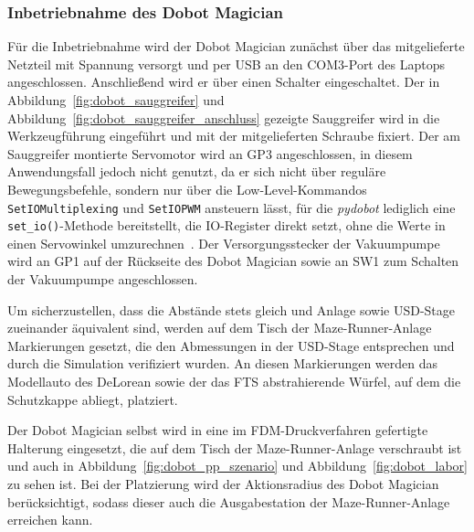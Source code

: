 \subsubsection{Inbetriebnahme des Dobot Magician}
\label{subsubsec:dobot_inbetriebnahme}

Für die Inbetriebnahme wird der Dobot Magician zunächst über das mitgelieferte Netzteil mit Spannung versorgt und per USB an den COM3-Port des Laptops angeschlossen.
Anschließend wird er über einen Schalter eingeschaltet.
Der in Abbildung~\ref{fig:dobot_sauggreifer} und Abbildung~\ref{fig:dobot_sauggreifer_anschluss} gezeigte Sauggreifer wird in die Werkzeugführung eingeführt und mit der mitgelieferten Schraube fixiert.
Der am Sauggreifer montierte Servomotor wird an GP3 angeschlossen, in diesem Anwendungsfall jedoch nicht genutzt, da er sich nicht über reguläre Bewegungsbefehle, sondern nur über die Low-Level-Kommandos \texttt{SetIOMultiplexing} und \texttt{SetIOPWM} ansteuern lässt, für die \emph{pydobot} lediglich eine \texttt{set\_io()}-Methode bereitstellt, die IO-Register direkt setzt, ohne die Werte in einen Servowinkel umzurechnen~\cite{dobot_communication_protocol,pydobot_docs}.
Der Versorgungsstecker der Vakuumpumpe wird an GP1 auf der Rückseite des Dobot Magician sowie an SW1 zum Schalten der Vakuumpumpe angeschlossen.

Um sicherzustellen, dass die Abstände stets gleich und Anlage sowie USD-Stage zueinander äquivalent sind, werden auf dem Tisch der Maze-Runner-Anlage Markierungen gesetzt, die den Abmessungen in der USD-Stage entsprechen und durch die Simulation verifiziert wurden.
An diesen Markierungen werden das Modellauto des DeLorean sowie der das FTS abstrahierende Würfel, auf dem die Schutzkappe abliegt, platziert.

Der Dobot Magician selbst wird in eine im FDM-Druckverfahren gefertigte Halterung eingesetzt, die auf dem Tisch der Maze-Runner-Anlage verschraubt ist und auch in Abbildung~\ref{fig:dobot_pp_szenario} und Abbildung~\ref{fig:dobot_labor} zu sehen ist.
Bei der Platzierung wird der Aktionsradius des Dobot Magician berücksichtigt, sodass dieser auch die Ausgabestation der Maze-Runner-Anlage erreichen kann.
